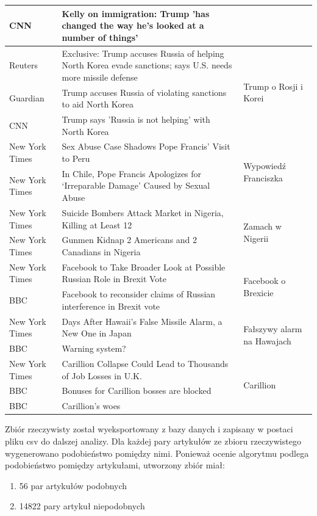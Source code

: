 \begin{center}
\begin{longtable}{|p{}|p{}|p{}|}
 CNN & Kelly on immigration: Trump 'has changed the way he's looked at a number of things'
 & \\ \hline
 Reuters & Exclusive: Trump accuses Russia of helping North Korea evade sanctions; says U.S. needs more missile defense
 & \multirow{3}{*}{Trump o Rosji i Korei} \\
 Guardian & Trump accuses Russia of violating sanctions to aid North Korea
 & \\
 CNN & Trump says 'Russia is not helping' with North Korea
 & \\ \hline
 New York Times & Sex Abuse Case Shadows Pope Francis’ Visit to Peru
 & \multirow{2}{*}{Wypowiedź Franciszka} \\
 New York Times & In Chile, Pope Francis Apologizes for ‘Irreparable Damage’ Caused by Sexual Abuse
 & \\ \hline
  New York Times & Suicide Bombers Attack Market in Nigeria, Killing at Least 12
 & \multirow{2}{*}{Zamach w Nigerii} \\
 New York Times & Gunmen Kidnap 2 Americans and 2 Canadians in Nigeria
 & \\ \hline
   New York Times & Facebook to Take Broader Look at Possible Russian Role in Brexit Vote
 & \multirow{2}{*}{Facebook o Brexicie} \\
 BBC & Facebook to reconsider claims of Russian interference in Brexit vote
 & \\ \hline
    New York Times & Days After Hawaii’s False Missile Alarm, a New One in Japan
 & \multirow{2}{*}{Fałszywy alarm na Hawajach} \\
 BBC & Warning system?
 & \\ \hline
 New York Times &  Carillion Collapse Could Lead to Thousands of Job Losses in U.K.
& \multirow{3}{*}{Carillion} \\
 BBC & Bonuses for Carillion bosses are blocked
 & \\
 BBC & Carillion's woes
 & \\ \hline
    \end{longtable}
\end{center}

Zbiór rzeczywisty został wyeksportowany z bazy danych i zapisany w postaci pliku csv do dalszej analizy.
Dla każdej pary artykułów ze zbioru rzeczywistego wygenerowano podobieństwo pomiędzy nimi. Ponieważ ocenie algorytmu podlega podobieństwo pomiędzy artykułami, utworzony zbiór miał:
\begin{enumerate}
	\item 56 par artykułów podobnych
	\item 14822 pary artykuł niepodobnych
\end{enumerate}

